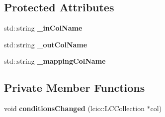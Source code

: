 \subsection*{Protected Attributes}
\begin{DoxyCompactItemize}
\item 
std\-::string {\bfseries \-\_\-in\-Col\-Name}\label{classAhcSROmappingProcessor_a79fb23db5c3484c5943e6e16f696a4b2}

\item 
std\-::string {\bfseries \-\_\-out\-Col\-Name}\label{classAhcSROmappingProcessor_aea0657c8950e0ebce40bac16f59ec2d8}

\item 
std\-::string {\bfseries \-\_\-mapping\-Col\-Name}\label{classAhcSROmappingProcessor_a0418b9e5c81b0b44fde4b77a7290366f}

\end{DoxyCompactItemize}
\subsection*{Private Member Functions}
\begin{DoxyCompactItemize}
\item 
void {\bfseries conditions\-Changed} (lcio\-::\-L\-C\-Collection $\ast$col)\label{classAhcSROmappingProcessor_ae67481b63f80aba4e19fdd12c4a74da4}

\end{DoxyCompactItemize}
